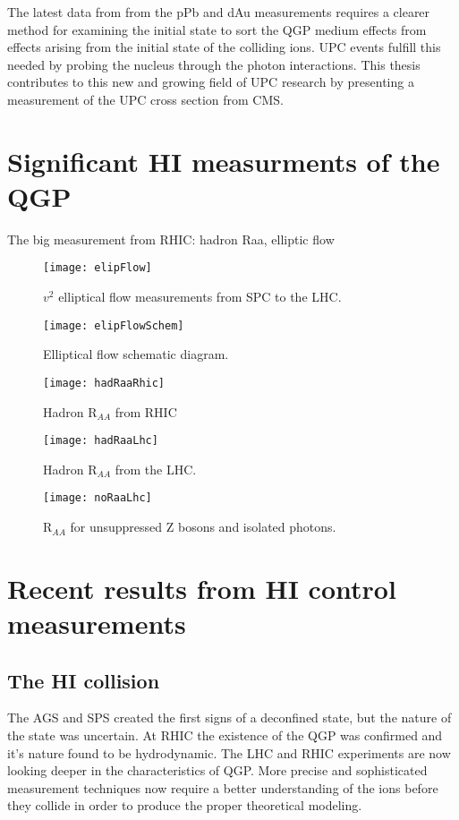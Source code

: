   The latest data from from the pPb and dAu measurements requires a clearer 
    method for examining the initial state to sort the QGP medium effects from
    effects arising from the initial state of the colliding ions.
  UPC events fulfill this needed by probing the nucleus through the photon 
    interactions.
  This thesis contributes to this new and growing field of UPC research by 
    presenting a measurement of the UPC \JPsi{} cross section from CMS.

  \section{Significant HI measurments of the QGP}
    The big measurement from RHIC: hadron Raa, elliptic flow
    \begin{figure}[!Hhbt]
      \centering
      \texttt{[image: elipFlow]}
      \caption{ $v^{2}$ elliptical flow measurements from SPC to the LHC.}
      \label{fig:elipFlow}
    \end{figure}

     \begin{figure}[!Hhbt]
      \centering
      \texttt{[image: elipFlowSchem]}
      \caption{ Elliptical flow schematic diagram.}
      \label{fig:elipFlowSchem}
    \end{figure}

    \begin{figure}[!Hhbt]
      \centering
      \texttt{[image: hadRaaRhic]}
      \caption{Hadron R$_{AA}$ from RHIC}
      \label{fig:hadRaaRhic}
    \end{figure}

    \begin{figure}[!Hhbt]
      \centering
      \texttt{[image: hadRaaLhc]}
      \caption{Hadron R$_{AA}$ from the LHC.}
      \label{fig:hadRaaLhc}
    \end{figure}

    \begin{figure}[!Hhbt]
      \centering
      \texttt{[image: noRaaLhc]}
      \caption{R$_{AA}$ for unsuppressed Z bosons and isolated photons.}
      \label{fig:noRaaLhc}
    \end{figure}

  \section{Recent results from HI control measurements}

    \subsection{The HI collision}
      The AGS and SPS created the first signs of a deconfined state, but the 
        nature of the state was uncertain.
      At RHIC the existence of the QGP was confirmed and it's nature found to 
        be hydrodynamic.
      The LHC and RHIC experiments are now looking deeper in the characteristics
        of QGP.
      More precise and sophisticated measurement techniques now require a 
        better understanding of the ions before they collide in order to 
        produce the proper theoretical modeling. 

